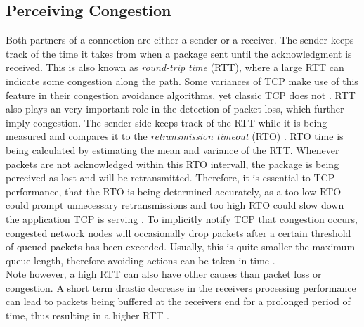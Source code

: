 \documentclass[a4paper,conference]{IEEEtran}
\begin{document}
\subsection{Perceiving Congestion}
\label{P_C_marker}
Both partners of a connection are either a sender or a receiver. The sender keeps track of the time it takes from when a package sent until the acknowledgment is received. This is also known as \textit{round-trip time} (RTT), where a large RTT can indicate some congestion along the path. Some variances of TCP make use of this feature in their congestion avoidance algorithms, yet classic TCP does not \cite{huston2000tcp,jacobson1995congestion}. RTT also plays an very important role in the detection of packet loss, which further imply congestion. The sender side keeps track of the RTT while it is being measured and compares it to the \textit{retransmission timeout} (RTO) \cite{jacobson1992tcp}. RTO time is being calculated by estimating the mean and variance of the RTT. Whenever packets are not acknowledged within this RTO intervall, the package is being perceived as lost and will be retransmitted. Therefore, it is essential to TCP performance, that the RTO is being determined accurately, as a too low RTO could prompt unnecessary retransmissions and too high RTO could slow down the application TCP is serving \cite{huston2000tcp,jacobson1995congestion}. To implicitly notify TCP that congestion occurs, congested network nodes will occasionally drop packets after a certain threshold of queued packets has been exceeded. Usually, this is quite smaller the maximum queue length, therefore avoiding actions can be taken in time \cite{ramakrishnan1999proposal}.\\
Note however, a high RTT can also have other causes than packet loss or congestion. A short term drastic decrease in the receivers processing performance can lead to packets being buffered at the receivers end for a prolonged period of time, thus resulting in a higher RTT \cite{huston2000tcp}.
\end{document}
